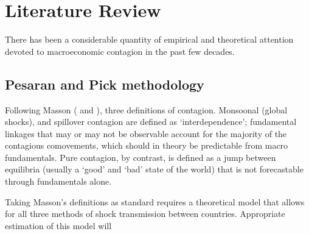 \documentclass[../base.tex]{subfiles}
\begin{document}
\section{Literature Review}

There has been a considerable quantity of empirical and theoretical attention devoted to macroeconomic contagion in the past few decades. 

\subsection{Pesaran and Pick methodology}
Following Masson (\cite{masson1998contagion} and \cite{masson1999contagion}), three definitions of contagion. Monsoonal (global shocks), and spillover contagion are defined as `interdependence'; fundamental linkages that may or may not be observable account for the majority of the contagious comovements, which should in theory be predictable from macro fundamentals. Pure contagion, by contrast, is defined as a jump between equilibria (usually a `good' and `bad' state of the world) that is not forecastable through fundamentals alone. 

Taking Masson's definitions as standard requires a theoretical model that allows for all three methods of shock transmission between countries. Appropriate estimation of this model will  
\end{document}
